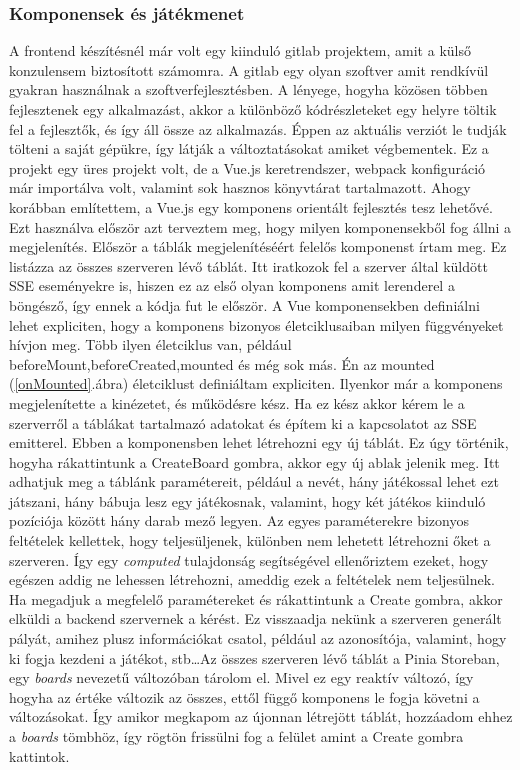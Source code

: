 \documentclass[a4paper,twoside]{article}
\begin{document}
\subsubsection{Komponensek és játékmenet}
A frontend készítésnél már volt egy kiinduló gitlab projektem, amit a külső konzulensem
biztosított számomra. A gitlab egy olyan szoftver amit rendkívül gyakran használnak a szoftverfejlesztésben. A lényege, hogyha közösen többen fejlesztenek egy alkalmazást, akkor a különböző kódrészleteket egy helyre töltik fel a fejlesztők, és így áll össze az alkalmazás. Éppen az aktuális verziót le tudják tölteni a saját gépükre, így látják a változtatásokat amiket végbementek. Ez a projekt egy üres projekt volt, de a Vue.js keretrendszer, webpack
konfiguráció már importálva volt, valamint sok hasznos könyvtárat tartalmazott. Ahogy
korábban említettem, a Vue.js egy komponens orientált fejlesztés tesz lehetővé. Ezt használva
először azt terveztem meg, hogy milyen komponensekből fog állni a megjelenítés.
Először a táblák megjelenítéséért felelős komponenst írtam meg. Ez listázza az összes
szerveren lévő táblát. Itt iratkozok fel a szerver által küldött SSE eseményekre is, hiszen ez az első olyan komponens amit lerenderel a böngésző, így ennek a kódja fut le először. A Vue komponensekben definiálni lehet expliciten, hogy a komponens bizonyos életciklusaiban milyen függvényeket hívjon meg. Több ilyen életciklus van, például beforeMount,beforeCreated,mounted és még sok más. Én az mounted (\ref{onMounted}.ábra) életciklust definiáltam expliciten. Ilyenkor már a komponens megjelenítette a kinézetet, és működésre kész. Ha ez kész akkor kérem le a szerverről a táblákat tartalmazó adatokat és építem ki a kapcsolatot az SSE emitterel. Ebben a komponensben lehet létrehozni egy új táblát. Ez úgy történik, hogyha rákattintunk a CreateBoard gombra, akkor egy új ablak jelenik meg. Itt adhatjuk meg a táblánk paramétereit, például a nevét, hány játékossal lehet ezt játszani, hány bábuja lesz egy játékosnak, valamint, hogy két játékos kiinduló pozíciója között hány darab mező legyen. Az egyes paraméterekre bizonyos feltételek kellettek, hogy teljesüljenek, különben nem lehetett létrehozni őket a szerveren. Így egy \textit{computed} tulajdonság segítségével ellenőriztem ezeket, hogy egészen addig ne lehessen létrehozni, ameddig ezek a feltételek nem teljesülnek. Ha megadjuk a megfelelő paramétereket és rákattintunk a Create gombra, akkor elküldi a backend szervernek a kérést. Ez visszaadja nekünk a szerveren generált pályát, amihez plusz információkat csatol, például az azonosítója, valamint, hogy ki fogja kezdeni a játékot, stb\ldots Az összes szerveren lévő táblát a Pinia Storeban, egy \textit{boards} nevezetű változóban tárolom el. Mivel ez egy reaktív változó, így hogyha az értéke változik az összes, ettől függő komponens le fogja követni a változásokat. Így amikor megkapom az újonnan létrejött táblát, hozzáadom ehhez a \textit{boards} tömbhöz, így rögtön frissülni fog a felület amint a Create gombra kattintok. 
\end{document}
